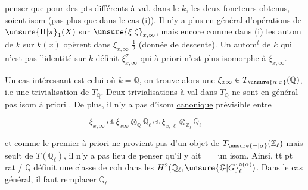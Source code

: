 penser que pour des pts différents à val. dans le  $k$, les deux foncteurs obtenus, soient isom (pas plus que dans le cas (i)). Il n’y a plus en général d’opérations de $\unsure{\Pi|\pi}_1(X)$ sur $\unsure{\xi|\zeta}_{x,\infty}$, mais encore comme dans (i) les autom de $k$ sur $k(x)$ opèrent dans $\xi_{x,\infty}$ $\tfrac12$ \uline{} (donnée de descente). Un autom$^{t}$ de $k$ qui n’est pas l’identité sur $k$ définit $\xi_{x,\infty}^{\sigma}$ qui à priori n’est plus isomorphe à $\xi_{x,\infty}$.

Un cas intéressant est celui où $k=\mathbb{Q}$, on trouve alors une  $\xi_{x\infty}\in T_{\unsure{\alpha|x}}(\mathbb{Q})$, i.e une trivialisation de $T_{\mathbb{Q}}$. Deux trivialisations à val dans $T_{\mathbb{Q}}$ ne sont en général pas isom à priori . De plus, il n’y a pas d’isom \uline{canonique} prévisible entre

\[
\xi_{x,\infty}\ \text{et}\ \xi_{x\infty}\otimes_{\mathbb{Q}}\mathbb{Q}_{\ell}\ \text{et}\ \xi_{\bar{x},\ell}\otimes_{\mathbb{Z}_{\ell}}\mathbb{Q}_{\ell}\quad -
\]

 et comme le premier à priori ne provient pas d’un objet de $T_{\unsure{-|\alpha}}(\mathbb{Z}_\ell)$ mais seult de $T(\mathbb{Q}_\ell)$, il n’y a pas lieu de penser qu’il y ait $=$ un isom. Ainsi, tt pt rat / $\mathbb{Q}$ définit une classe de coh dans les $H^{2}(\mathbb{Q}_\ell,\unsure{\mathbb{G}|G}^{\circ(\alpha)}_{\ell})$. Dans le  cas général, il faut remplacer $\mathbb{Q}_\ell$


